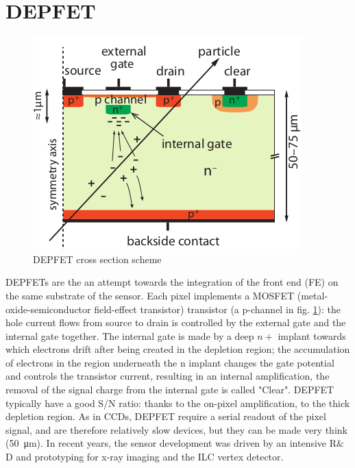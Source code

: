    \section{DEPFET}
   \begin{figure}
      \centering
      \includegraphics[width=0.55\linewidth]{figures/Pixel_detectors/DEPFET_scheme.png}
      \caption{DEPFET cross section scheme}
      \label{fig:DEPFET_scheme}
   \end{figure}
   DEPFETs are the an attempt towards the integration of the front end (FE) on the same substrate of the sensor.
   Each pixel implements a MOSFET (metal-oxide-semiconductor field-effect transistor) transistor (a p-channel in fig. \ref{fig:DEPFET_scheme}): the hole current flows from source to drain is controlled by the external gate and the internal gate together. The internal gate is made by a deep $n+$ implant towards which electrons drift after being created in the depletion region; the accumulation of electrons in the region underneath the n implant changes the gate potential and controls the transistor current, resulting in an internal amplification, the removal of the signal charge from the internal gate is called "Clear". 
   DEPFET typically have a good S/N ratio: thanks to the on-pixel amplification, to the thick depletion region. 
   As in CCDs, DEPFET require a serial readout of the pixel signal, and are therefore relatively slow devices, but they can be made very think (\SI{50}{\um}).
   In recent years, the sensor development was driven by an intensive R$\&$D and prototyping for x-ray imaging and the ILC vertex detector. 
   



